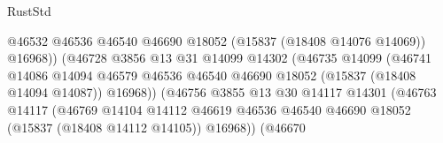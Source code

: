 \begin{lexlean}{RustStd}
\begin{coremodule}
{\begin{coremodule}
{{{{{{{{{{{{{{{{{{{{{{{{{{{{{{{{{{{{{{{{{{{{{{{{{{{{{{{{{{{{                                                  @46532
                                                  @46536
                                                  @46540
                                                  @46690
                                                  @18052
                                                  (@15837 (@18408 @14076 @14069))
                                                  @16968))
                                              (@46728
                                                @3856
                                                @13
                                                @31
                                                @14099
                                                @14302
                                                (@46735
                                                  @14099
                                                  (@46741
                                                    @14086
                                                    @14094
                                                    @46579
                                                    @46536
                                                    @46540
                                                    @46690
                                                    @18052
                                                    (@15837 (@18408 @14094 @14087))
                                                    @16968))
                                                (@46756
                                                  @3855
                                                  @13
                                                  @30
                                                  @14117
                                                  @14301
                                                  (@46763
                                                    @14117
                                                    (@46769
                                                      @14104
                                                      @14112
                                                      @46619
                                                      @46536
                                                      @46540
                                                      @46690
                                                      @18052
                                                      (@15837 (@18408 @14112 @14105))
                                                      @16968))
                                                  (@46670
}}}}}}}}}}}}}}}}}}}}}}}}}}}}}}}}}}}}}}}}}}}}}}}}}}}}}}}}}}}}
\end{coremodule}}
\end{coremodule}
\end{lexlean}
